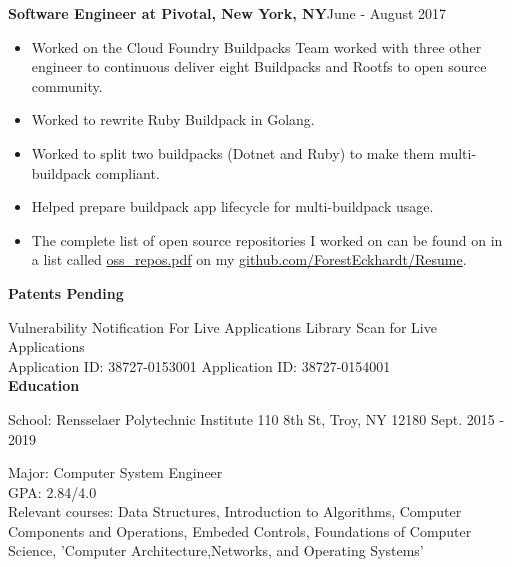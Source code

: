 \documentclass[10pt,a4papaer]{article}
\begin{document}
{	{\noindent\textbf{Software Engineer at Pivotal, New York, NY}}{\hfill June - August 2017}
	\begin{itemize}[noitemsep, topsep=0pt]
		\item Worked on the Cloud Foundry Buildpacks Team worked with three other engineer to continuous deliver eight Buildpacks and Rootfs to open source community. 
		\item Worked to rewrite Ruby Buildpack in Golang.
		\item Worked to split two buildpacks (Dotnet and Ruby) to make them multi-buildpack compliant.
		\item Helped prepare buildpack app lifecycle for multi-buildpack usage.
		\item The complete list of open source repositories I worked on can be found on in a list called \href{http://www.github.com/ForestEckhardt/Resume/blob/master/oss_repos.pdf}{ oss\_repos.pdf} on my \href{http://www.github.com/ForestEckhardt/Resume}{github.com/ForestEckhardt/Resume}.\\
		
	\end{itemize}
	
	\setlength{\leftskip}{0pt}
	
	{\noindent\textbf{Patents Pending}\vspace*{-20px}\\}
	
	\noindent\makebox[\linewidth]{\rule{\textwidth}{1pt}}
	
	\setlength{\leftskip}{15pt}
	
	\noindent Vulnerability Notification For Live Applications {\hfill Library Scan for Live Applications}\\
	Application ID: 38727-0153001 {\hfill Application ID: 38727-0154001\quad}\\
	
	\setlength{\leftskip}{0pt}
	{\noindent\textbf{Education}}\vspace*{-20px}\\
	
	\noindent\makebox[\linewidth]{\rule{\textwidth}{1.3pt}}
	
	{ School: Rensselaer Polytechnic Institute 110 8th St, Troy, NY 12180 {\hfill Sept. 2015 - 2019}}
	
	\setlength{\leftskip}{50pt}
	
	{\noindent Major: Computer System Engineer\\
		GPA: 2.84/4.0\\
		Relevant courses: Data Structures, Introduction to Algorithms, Computer Components and Operations, Embeded Controls, Foundations of Computer Science, 'Computer Architecture,Networks, and Operating Systems'}\\
	
}
\end{document}
